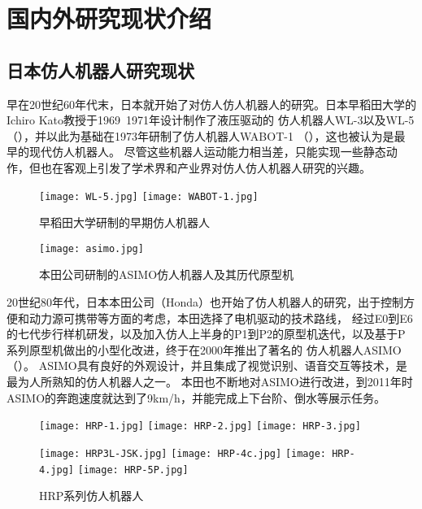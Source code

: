 \section{国内外研究现状介绍}
\subsection{日本仿人机器人研究现状}

早在20世纪60年代末，日本就开始了对仿人仿人机器人的研究。日本早稻田大学的Ichiro Kato教授于1969~1971年设计制作了液压驱动的
仿人机器人WL-3以及WL-5（），并以此为基础在1973年研制了仿人机器人WABOT-1 （），这也被认为是最早的现代仿人机器人。
尽管这些机器人运动能力相当差，只能实现一些静态动作，但也在客观上引发了学术界和产业界对仿人仿人机器人研究的兴趣。
\begin{figure}[htbp]
    \centering
        {%
            \texttt{[image: WL-5.jpg]}}
        {%
            \texttt{[image: WABOT-1.jpg]}}
    \caption{早稻田大学研制的早期仿人机器人\label{fig:japan_old}}
\end{figure}
\begin{figure}[htbp]
    \centering
    \texttt{[image: asimo.jpg]}
    \caption{\label{fig:asimo}本田公司研制的ASIMO仿人机器人及其历代原型机}
\end{figure}
20世纪80年代，日本本田公司（Honda）也开始了仿人机器人的研究，出于控制方便和动力源可携带等方面的考虑，本田选择了电机驱动的技术路线，
经过E0到E6的七代步行样机研发，以及加入仿人上半身的P1到P2的原型机迭代，以及基于P系列原型机做出的小型化改进，终于在2000年推出了著名的
仿人机器人ASIMO（）。 ASIMO具有良好的外观设计，并且集成了视觉识别、语音交互等技术，是最为人所熟知的仿人机器人之一。
本田也不断地对ASIMO进行改进，到2011年时ASIMO的奔跑速度就达到了9km/h，并能完成上下台阶、倒水等展示任务\cite{Honda}。
\begin{figure}[htbp]
    \centering
        {%
            \texttt{[image: HRP-1.jpg]}}
        {%
            \texttt{[image: HRP-2.jpg]}}
        {%
            \texttt{[image: HRP-3.jpg]}}

        {%
            \texttt{[image: HRP3L-JSK.jpg]}}   
        {%
            \texttt{[image: HRP-4c.jpg]}}       
        {%
            \texttt{[image: HRP-4.jpg]}}       
        {%
            \texttt{[image: HRP-5P.jpg]}}       

    \caption{HRP系列仿人机器人\label{fig:japan_hrp}}
\end{figure}

